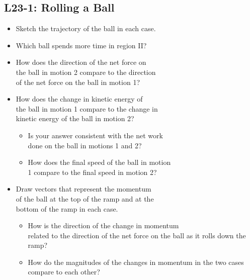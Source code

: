 \documentclass[]{article}
\newcommand{\Week}{23}
\begin{document}
\begin{PresentSpace}
\vspace{-10pt}
\section*{L\Week-1: Rolling a Ball}
\vspace{-10pt}
\begin{itemize}
	\large
	\item Sketch the trajectory of the ball in each case.
	\item Which ball spends more time in region II?
	\item How does the direction of the net force on \\
	the ball in motion 2 compare to the direction \\
	of the net force on the ball in motion 1?
	\item How does the change in kinetic energy of \\
	the ball in motion 1 compare to the change in \\
	kinetic energy of the ball in motion 2?
	\begin{itemize}
		\normalsize
		\item Is your answer consistent with the net work \\
		done on the ball in motions 1 and 2?
		\item How does the final speed of the ball in motion \\
		1 compare to the final speed in motion 2?
	\end{itemize}
	\item Draw vectors that represent the momentum \\
	of the ball at the top of the ramp and at the \\
	bottom of the ramp in each case.
	\begin{itemize}
		\normalsize
		\item How is the direction of the change in momentum \\
		related to the direction of the net force on the ball as it rolls down the ramp?
		\item How do the magnitudes of the changes in momentum in the two cases compare to each other?
	\end{itemize}
\end{itemize}
\end{PresentSpace}
\end{document}
